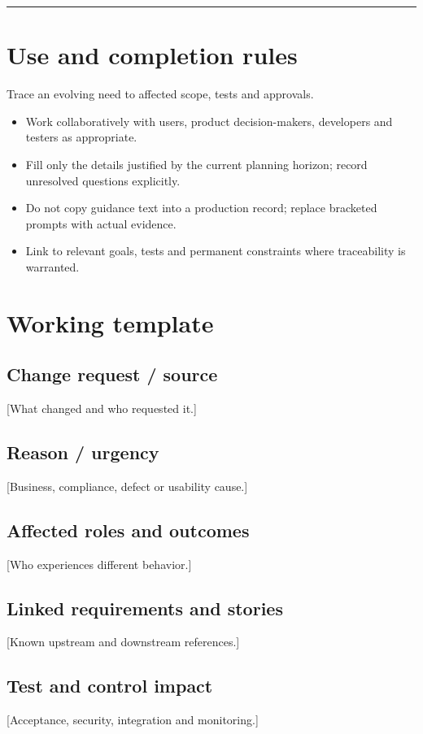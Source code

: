 \documentclass[11pt,letterpaper]{article}
\begin{document}
\tableofcontents\medskip\noindent\rule{\linewidth}{0.4pt}\medskip
\section{Use and completion rules}
Trace an evolving need to affected scope, tests and approvals.

\begin{itemize}[leftmargin=*,itemsep=2pt]
\item Work collaboratively with users, product decision-makers, developers and testers as appropriate.
\item Fill only the details justified by the current planning horizon; record unresolved questions explicitly.
\item Do not copy guidance text into a production record; replace bracketed prompts with actual evidence.
\item Link to relevant goals, tests and permanent constraints where traceability is warranted.
\end{itemize}
\section{Working template}
\subsection{Change request / source}
[What changed and who requested it.]

\subsection{Reason / urgency}
[Business, compliance, defect or usability cause.]

\subsection{Affected roles and outcomes}
[Who experiences different behavior.]

\subsection{Linked requirements and stories}
[Known upstream and downstream references.]

\subsection{Test and control impact}
[Acceptance, security, integration and monitoring.]
\end{document}
